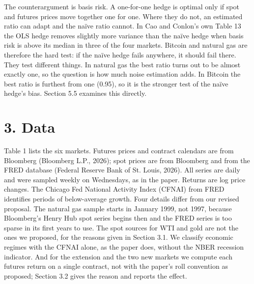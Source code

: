\documentclass[11pt,letterpaper]{article}
\begin{document}
The counterargument is basis risk. A one-for-one hedge is optimal only if spot and futures prices move together one for one. Where they do not, an estimated ratio can adapt and the naïve ratio cannot. In Cao and Conlon's own Table 13 the OLS hedge removes slightly more variance than the naïve hedge when basis risk is above its median in three of the four markets. Bitcoin and natural gas are therefore the hard test: if the naïve hedge fails anywhere, it should fail there. They test different things. In natural gas the best ratio turns out to be almost exactly one, so the question is how much noise estimation adds. In Bitcoin the best ratio is furthest from one (0.95), so it is the stronger test of the naïve hedge's bias. Section 5.5 examines this directly.

\section*{3. Data}

Table 1 lists the six markets. Futures prices and contract calendars are from Bloomberg (Bloomberg L.P., 2026); spot prices are from Bloomberg and from the FRED database (Federal Reserve Bank of St. Louis, 2026). All series are daily and were sampled weekly on Wednesdays, as in the paper. Returns are log price changes. The Chicago Fed National Activity Index (CFNAI) from FRED identifies periods of below-average growth. Four details differ from our revised proposal. The natural gas sample starts in January 1999, not 1997, because Bloomberg's Henry Hub spot series begins then and the FRED series is too sparse in its first years to use. The spot sources for WTI and gold are not the ones we proposed, for the reasons given in Section 3.1. We classify economic regimes with the CFNAI alone, as the paper does, without the NBER recession indicator. And for the extension and the two new markets we compute each futures return on a single contract, not with the paper's roll convention as proposed; Section 3.2 gives the reason and reports the effect.
\end{document}
